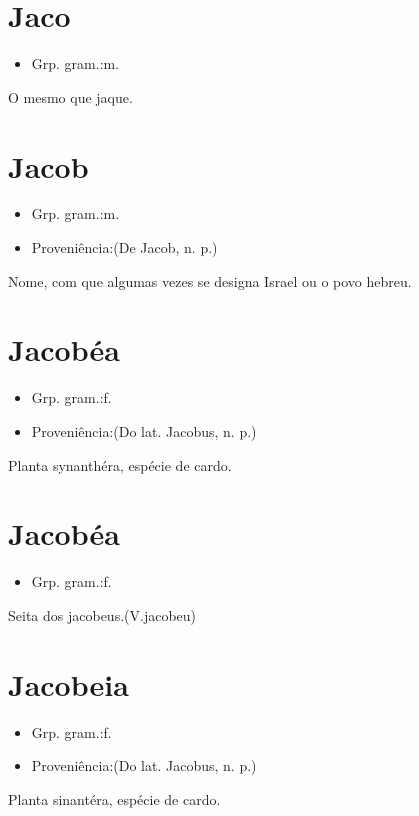 \documentclass{article}
\begin{document}
\section{Jaco}
\begin{itemize}
\item {Grp. gram.:m.}
\end{itemize}
O mesmo que \textunderscore jaque\textunderscore .
\section{Jacob}
\begin{itemize}
\item {Grp. gram.:m.}
\end{itemize}
\begin{itemize}
\item {Proveniência:(De \textunderscore Jacob\textunderscore , n. p.)}
\end{itemize}
Nome, com que algumas vezes se designa Israel ou o povo hebreu.
\section{Jacobéa}
\begin{itemize}
\item {Grp. gram.:f.}
\end{itemize}
\begin{itemize}
\item {Proveniência:(Do lat. \textunderscore Jacobus\textunderscore , n. p.)}
\end{itemize}
Planta synanthéra, espécie de cardo.
\section{Jacobéa}
\begin{itemize}
\item {Grp. gram.:f.}
\end{itemize}
Seita dos jacobeus.(V.jacobeu)
\section{Jacobeia}
\begin{itemize}
\item {Grp. gram.:f.}
\end{itemize}
\begin{itemize}
\item {Proveniência:(Do lat. \textunderscore Jacobus\textunderscore , n. p.)}
\end{itemize}
Planta sinantéra, espécie de cardo.
\end{document}
